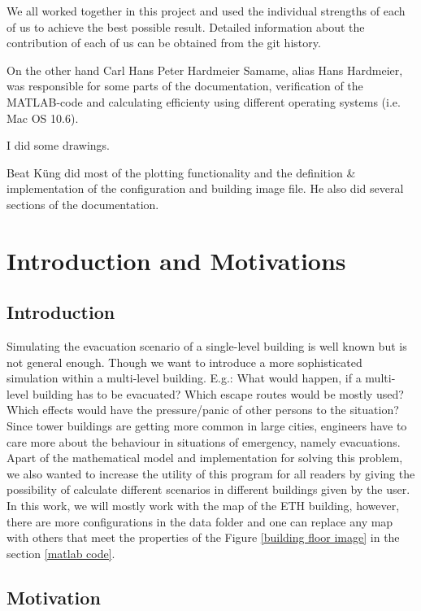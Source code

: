\documentclass[11pt]{article}
\begin{document}
We all worked together in this project and used the individual strengths of each
of us to achieve the best possible result. Detailed information about the
contribution of each of us can be obtained from the git history.

On the other hand Carl Hans Peter Hardmeier Samame, alias Hans Hardmeier, was 
responsible for some parts of the documentation, verification of the MATLAB-code
and calculating efficienty using different operating systems (i.e. Mac OS 10.6).

I did some drawings.


Beat K\"ung did most of the plotting functionality and the definition \&
implementation of the configuration and building image file. He also did several
sections of the documentation.




\section{Introduction and Motivations}

\subsection{Introduction}

Simulating the evacuation scenario of a single-level building is well known but
is not general enough. Though we want to introduce a more sophisticated
simulation within a multi-level building. E.g.: What would happen, if a
multi-level building has to be evacuated? Which escape routes would be mostly
used? Which effects would have the pressure/panic of other persons to the
situation? Since tower buildings are getting more common in large cities,
engineers have to care more about the behaviour in situations of emergency,
namely evacuations. Apart of the mathematical model and implementation for
solving this problem, we also wanted to increase the utility of this program for
all readers by giving the possibility of calculate different scenarios in
different buildings given by the user. In this work, we will mostly work with
the map of the ETH building, however, there are more configurations in the data
folder and one can replace any map with others that meet the properties of the
Figure \ref{building floor image} in the section \ref{matlab code}.

\subsection{Motivation}
\end{document}
